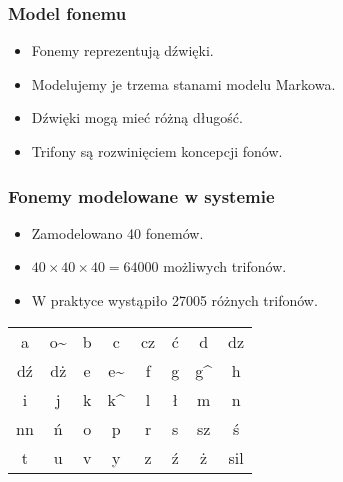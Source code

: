 \documentclass[mathserif, serif]{beamer}
\begin{document}
	\begin{frame}
		\frametitle{Model fonemu}
		
			\begin{itemize}
				\item Fonemy reprezentują dźwięki.
				\item Modelujemy je trzema stanami modelu Markowa.
				\item Dźwięki mogą mieć różną długość.
				\item Trifony są rozwinięciem koncepcji fonów.
			\end{itemize}		
		
			\begin{figure}[H]
		\end{figure}
	\end{frame}

	\begin{frame}
		\frametitle{Fonemy modelowane w systemie}
		
		\begin{itemize}
			\item Zamodelowano 40 fonemów.
			\item $40\times40\times40=64000$ możliwych trifonów.
			\item W praktyce wystąpiło 27005 różnych trifonów.
		\end{itemize}		
		
		\begin{table}
			\begin{tabular}{|c c c c c c c c|}
				\hline
				a  & o\~ & b & c & cz & ć & d & dz \\ 
				dź & dż & e & e\~ & f & g & g\^ & h \\
				i & j & k & k\^ & l & ł & m & n \\
				nn & ń & o & p  & r & s & sz & ś \\
				t & u & v & y & z & ź & ż & sil \\
				\hline
			\end{tabular}
		\end{table}
	\end{frame}
\end{document}
